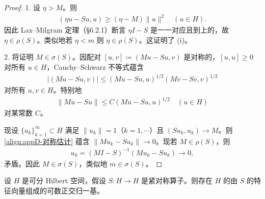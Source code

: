 \documentclass[../main.tex]{subfiles}
\begin{document}
\begin{proof}
1. 设 $\eta>M$。则
\begin{align*}
(\eta u-Su,u)\geqslant(\eta-M)\|u\|^2 \quad (u\in H).
\end{align*}
因此 Lax--Milgram 定理（\S6.2.1）断言 $\eta I-S$ 是一一对应且到上的，故 $\eta\in\rho(S)$。类似地若 $\eta<m$ 则 $\eta\in\rho(S)$。这证明了 (i)。

2. 将证明 $M\in\sigma(S)$。因配对 $[u,v]\coloneqq(Mu-Su,v)$ 是对称的，$[u,u]\geqslant 0$ 对所有 $u\in H$，Cauchy--Schwarz 不等式蕴含
\begin{align*}
|(Mu-Su,v)|\leqslant(Mu-Su,u)^{1/2}(Mv-Sv,v)^{1/2}
\end{align*}
对所有 $u,v\in H$。特别地
\begin{align}
\|Mu-Su\|\leqslant C(Mu-Su,u)^{1/2} \quad (u\in H)
\label{align:appD-对称估计}
\end{align}
对某常数 $C$。

现设 $\{u_k\}_{k=1}^\infty\subset H$ 满足 $\|u_k\|=1$（$k=1,\cdots$）且 $(Su_k,u_k)\to M$。则\eqref{align:appD-对称估计} 蕴含 $\|Mu_k-Su_k\|\to 0$。现若 $M\in\rho(S)$，则
\begin{align*}
u_k=(MI-S)^{-1}(Mu_k-Su_k)\to 0,
\end{align*}
矛盾。因此 $M\in\sigma(S)$，类似地 $m\in\sigma(S)$。
\end{proof}

\begin{theorem}[紧对称算子的特征向量。]\label{theorem:appD-紧对称特征向量}设 $H$ 是可分 Hilbert 空间，假设 $S:H\to H$ 是紧对称算子。则存在 $H$ 的由 $S$ 的特征向量组成的可数正交归一基。
\end{theorem}
\end{document}
